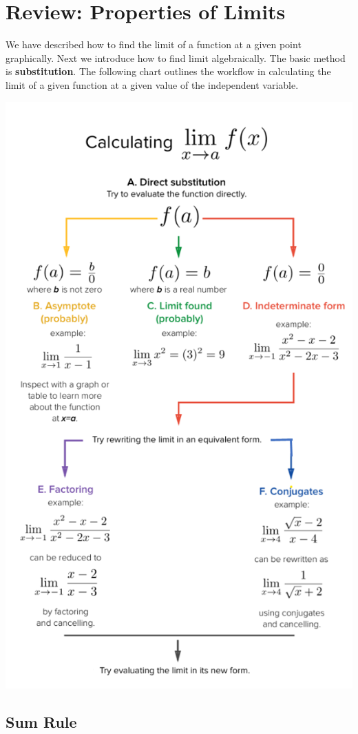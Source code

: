 \documentclass[
]{book}
\begin{document}
\hypertarget{review-properties-of-limits}{%
\section{Review: Properties of Limits}\label{review-properties-of-limits}}

We have described how to find the limit of a function at a given point graphically. Next we introduce how to find limit algebraically. The basic method is \textbf{substitution}. The following chart outlines the workflow in calculating the limit of a given function at a given value of the independent variable.

\begin{center}\includegraphics[width=0.75\linewidth]{img01/w01-CalculateLimit} \end{center}

\hypertarget{sum-rule-1}{%
\subsection{Sum Rule}\label{sum-rule-1}}
\end{document}
